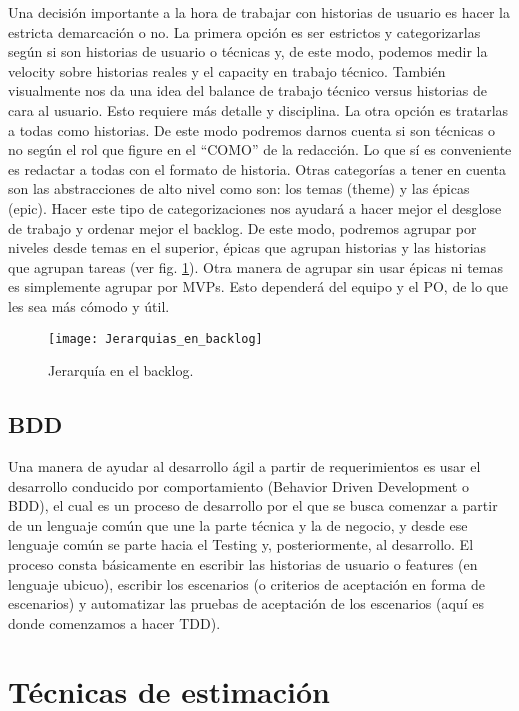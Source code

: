 Una decisión importante a la hora de trabajar con historias de usuario es hacer la estricta demarcación o no. La primera opción es ser estrictos y categorizarlas según si son historias de usuario o técnicas y, de este modo, podemos medir la velocity sobre historias reales y el capacity en trabajo técnico. También visualmente nos da una idea del balance de trabajo técnico versus historias de cara al usuario. Esto requiere más detalle y disciplina. La otra opción es tratarlas a todas como historias. De este modo podremos darnos cuenta si son técnicas o no según el rol que figure en el “COMO” de la redacción. Lo que sí es conveniente es redactar a todas con el formato de historia.
Otras categorías a tener en cuenta son las abstracciones de alto nivel como son: los temas (theme) y las épicas (epic). Hacer este tipo de categorizaciones nos ayudará a hacer mejor el desglose de trabajo y ordenar mejor el backlog. De este modo, podremos agrupar por niveles desde temas en el superior, épicas que agrupan historias y las historias que agrupan tareas (ver fig. \ref{fig:Jerarquias_en_backlog}). Otra manera de agrupar sin usar épicas ni temas es simplemente agrupar por MVPs. Esto dependerá del equipo y el PO, de lo que les sea más cómodo y útil.

\begin{figure}[h]
  \centering
  \texttt{[image: Jerarquias\_en\_backlog]}
  \caption{Jerarquía en el backlog.}
  \centering
  \label{fig:Jerarquias_en_backlog} %
\end{figure}

\subsection{BDD}

Una manera de ayudar al desarrollo ágil a partir de requerimientos es usar el desarrollo conducido por comportamiento (Behavior Driven Development o BDD), el cual es un proceso de desarrollo por el que se busca comenzar a partir de un lenguaje común que une la parte técnica y la de negocio, y desde ese lenguaje común se parte hacia el Testing y, posteriormente, al desarrollo. El proceso consta básicamente en escribir las historias de usuario o features (en lenguaje ubicuo), escribir los escenarios (o criterios de aceptación en forma de escenarios) y automatizar las pruebas de aceptación de los escenarios (aquí es donde comenzamos a hacer TDD).


\section{Técnicas de estimación}

